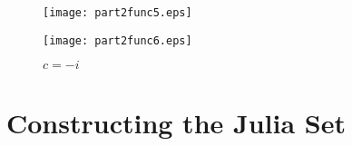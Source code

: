 \documentclass[11pt]{article}
\begin{document}
   \begin{figure}[!h]
  \begin{minipage}[b]{0.45\textwidth}
    \texttt{[image: part2func5.eps]}
    \caption{$c = -1$}
  \end{minipage}
  \hfill
  \begin{minipage}[b]{0.45\textwidth}
    \texttt{[image: part2func6.eps]}
    \caption{$c = -i$}
  \end{minipage}

\end{figure}

\section{Constructing the Julia Set}
\end{document}
